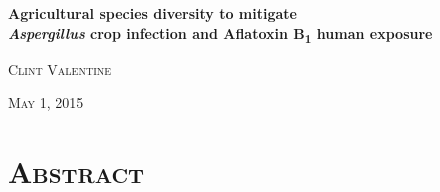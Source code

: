 \documentclass[a4paper,12pt]{article}
\begin{document}
\lstset{language=R}

\begin{titlepage}

\noindent

\begin{center}

\textbf{Agricultural species diversity to mitigate\\\textit{Aspergillus} crop infection and Aflatoxin B\textsubscript{1} human exposure}

\noindent\textsc{Clint Valentine}

\noindent\textsc{May 1, 2015}

\end{center}

\end{titlepage}

\doublespacing


\section*{\upshape\textsc{Abstract}}
\end{document}
